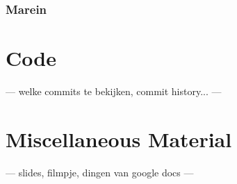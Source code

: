 \documentclass[10pt, abstracton, twocolumn]{scrartcl}
\begin{document}
\begin{appendices}
\subsubsection{Marein}


\section{Code}
---
welke commits te bekijken, commit history...
---

\section{Miscellaneous Material}
---
slides, filmpje, dingen van google docs
---

\end{appendices}
\end{document}
